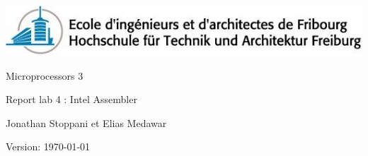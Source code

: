\begin{titlepage}
	

		
	\addtolength{\leftskip}{-1cm}\addtolength{\rightskip}{-3.5cm}
	\vfill
	
	\hspace{0.10cm}	\includegraphics{./images/model/eifr-logo.jpg} 

	\vfill
	\hspace{8.99cm}\Huge Microprocessors  3 
	
	\hspace{9.08cm}\LARGE Report lab 4 : Intel Assembler
	      
	\vfill
	\Large
	
	\hspace{9.08cm}  Jonathan Stoppani et Elias Medawar
	
	\vfill
	\hspace{9.08cm}\normalsize Version:  \today
	\vfill
	\thispagestyle{empty}
	\clearpage

\end{titlepage}
